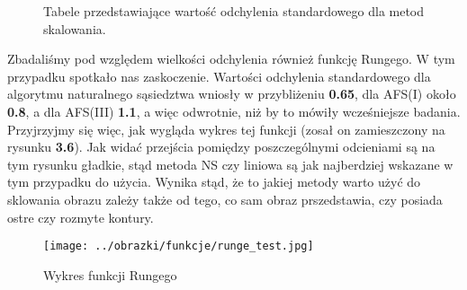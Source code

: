 \begin{figure}[h!tb]
\begin{center}
\caption{Tabele przedstawiające wartość odchylenia standardowego dla metod skalowania.}
\end{center}
\end{figure}

Zbadaliśmy pod względem wielkości odchylenia również funkcję Rungego. W tym przypadku spotkało
nas zaskoczenie. Wartości odchylenia standardowego dla algorytmu naturalnego sąsiedztwa wniosły
w przybliżeniu \textbf{0.65}, dla AFS(I) około \textbf{0.8}, a dla AFS(III) \textbf{1.1}, a więc
odwrotnie, niż by to mówiły wcześniejsze badania. Przyjrzyjmy się więc, jak wygląda wykres tej funkcji
(zosał on zamieszczony na rysunku \textbf{3.6}). Jak widać przejścia pomiędzy poszczególnymi odcieniami
są na tym rysunku gładkie, stąd metoda NS czy liniowa są jak najberdziej wskazane w tym przypadku do użycia.
Wynika stąd, że to jakiej metody warto użyć do sklowania obrazu zależy także od tego, co sam obraz prszedstawia,
czy posiada ostre czy rozmyte kontury.
\begin{figure}[h!tb]
\begin{center}
\texttt{[image: ../obrazki/funkcje/runge\_test.jpg]}
\caption{Wykres funkcji Rungego}
\end{center}
\end{figure}


